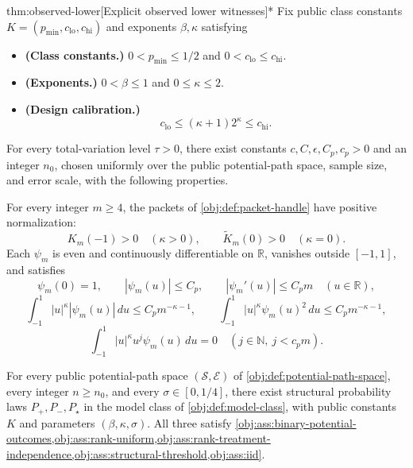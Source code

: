 \documentclass[11pt]{article}
\begin{document}
\begin{theoremv}{thm:observed-lower}[Explicit observed lower witnesses]*
Fix public class constants \(K=(p_{\min},c_{\mathrm{lo}},c_{\mathrm{hi}})\) and exponents \(\beta,\kappa\) satisfying
\begin{itemize}
\item \textbf{(Class constants.)} \(0<p_{\min}\le1/2\) and \(0<c_{\mathrm{lo}}\le c_{\mathrm{hi}}\).
\item \textbf{(Exponents.)} \(0<\beta\le1\) and \(0\le\kappa\le2\).
\item \textbf{(Design calibration.)}
\[
c_{\mathrm{lo}}\le(\kappa+1)2^\kappa\le c_{\mathrm{hi}}.
\]
\end{itemize}
For every total-variation level \(\tau>0\), there exist constants \(c,C,\epsilon,C_p,c_p>0\) and an integer \(n_0\), chosen uniformly over the public potential-path space, sample size, and error scale, with the following properties.

For every integer \(m\ge4\), the packets of \cref{obj:def:packet-handle} have positive normalization:
\[
K_m(-1)>0\quad(\kappa>0),
\qquad
\widetilde K_m(0)>0\quad(\kappa=0).
\]
Each \(\psi_m\) is even and continuously differentiable on \(\mathbb R\), vanishes outside \([-1,1]\), and satisfies
\[
\psi_m(0)=1,\qquad
|\psi_m(u)|\le C_p,\qquad
|\psi_m'(u)|\le C_pm
\quad(u\in\mathbb R),
\]
\[
\int_{-1}^{1}|u|^\kappa|\psi_m(u)|\,du\le C_pm^{-\kappa-1},
\qquad
\int_{-1}^{1}|u|^\kappa\psi_m(u)^2\,du\le C_pm^{-\kappa-1},
\]
\[
\int_{-1}^{1}|u|^\kappa u^j\psi_m(u)\,du=0
\quad(j\in\mathbb N,\ j<c_pm).
\]

For every public potential-path space \((\mathcal S,\mathcal E)\) of \cref{obj:def:potential-path-space}, every integer \(n\ge n_0\), and every \(\sigma\in[0,1/4]\), there exist structural probability laws \(P_+,P_-,P_\star\) in the model class of \cref{obj:def:model-class}, with public constants \(K\) and parameters \((\beta,\kappa,\sigma)\). All three satisfy \cref{obj:ass:binary-potential-outcomes,obj:ass:rank-uniform,obj:ass:rank-treatment-independence,obj:ass:structural-threshold,obj:ass:iid}.


\end{theoremv}
\end{document}
